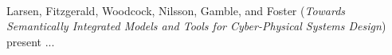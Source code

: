 

\ \hline \ %

Larsen, Fitzgerald, Woodcock, Nilsson, Gamble, and Foster
\cite{isola-2016-larsen}
({\em Towards Semantically Integrated Models and Tools for
Cyber-Physical Systems Design})
present ...


